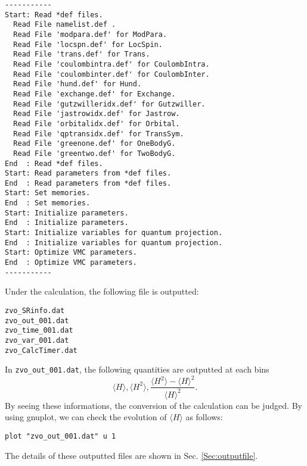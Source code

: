 \begin{verbatim}
-----------
Start: Read *def files.
  Read File namelist.def .
  Read File 'modpara.def' for ModPara.
  Read File 'locspn.def' for LocSpin.
  Read File 'trans.def' for Trans.
  Read File 'coulombintra.def' for CoulombIntra.
  Read File 'coulombinter.def' for CoulombInter.
  Read File 'hund.def' for Hund.
  Read File 'exchange.def' for Exchange.
  Read File 'gutzwilleridx.def' for Gutzwiller.
  Read File 'jastrowidx.def' for Jastrow.
  Read File 'orbitalidx.def' for Orbital.
  Read File 'qptransidx.def' for TransSym.
  Read File 'greenone.def' for OneBodyG.
  Read File 'greentwo.def' for TwoBodyG.
End  : Read *def files.
Start: Read parameters from *def files.
End  : Read parameters from *def files.
Start: Set memories.
End  : Set memories.
Start: Initialize parameters.
End  : Initialize parameters.
Start: Initialize variables for quantum projection.
End  : Initialize variables for quantum projection.
Start: Optimize VMC parameters.
End  : Optimize VMC parameters.
-----------
\end{verbatim}

Under the calculation, the following file is outputted:\\
\begin{minipage}{12cm}
  \begin{screen}
\begin{verbatim}
zvo_SRinfo.dat
zvo_out_001.dat
zvo_time_001.dat
zvo_var_001.dat
zvo_CalcTimer.dat
\end{verbatim}
  \end{screen}
\end{minipage}

In \verb|zvo_out_001.dat|, the following quantities are outputted at each bins  
\begin{equation}
\langle H \rangle, \langle H^2 \rangle, \frac{\langle H^2 \rangle- \langle H \rangle^2 }{\langle H \rangle^2} \nonumber.
\end{equation}
By seeing these informations, the conversion of the calculation can be judged. 
By using gnuplot, we can check the evolution of $\langle H \rangle$ as follows:
\begin{verbatim}
plot "zvo_out_001.dat" u 1
\end{verbatim}
The details of these outputted files are shown in Sec. \ref{Sec:outputfile}.\\

